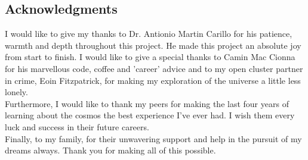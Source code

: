 \documentclass[twocolumn]{aastex631}
\begin{document}
\begin{acknowledgments}
    \section*{Acknowledgments}
    I would like to give my thanks to Dr. Antionio Martin Carillo for his patience, warmth and depth throughout this project. He made this project an absolute joy from start to finish. I would like to give a special thanks to Camin Mac Cionna for his marvellous code, coffee and 'career' advice and to my open cluster partner in crime, Eoin Fitzpatrick, for making my exploration of the universe a little less lonely. \\ 
    Furthermore, I would like to thank my peers for making the last four years of learning about the cosmos the best experience I've ever had. I wish them every luck and success in their future careers.  \\ Finally, to my family, for their unwavering support and help in the pursuit of my dreams always. Thank you for making all of this possible. 
\end{acknowledgments}

\appendix
\end{document}
